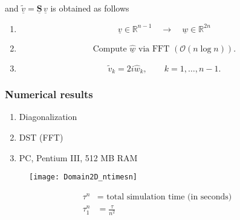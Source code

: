 and $\underline{\widetilde{v}} = \underline{\mathbf{S}} \, \underline{v}$ is obtained as follows

\renewcommand{\theenumi}{\roman{enumi}}
\renewcommand{\labelenumi}{\textbf{\theenumi)}}

\begin{enumerate}
  \item
    \begin{equation*}
      \underline{v} \in \mathbb{R}^{n-1} \quad \rightarrow \quad \underline{w} \in \mathbb{R}^{2n}
    \end{equation*}

  \item
    \begin{equation*}
      \text{Compute } \underline{\hat{w}} \text{ via FFT } (\mathcal{O}(n \log n)).
    \end{equation*}
  \item
    \begin{equation*}
      \widetilde{v}_k = 2i \hat{w}_k, \qquad k=1,\ldots,n-1.
    \end{equation*}

\end{enumerate}

\newpage
\subsubsection{Numerical results}

\renewcommand{\theenumi}{$\bullet$}
\renewcommand{\labelenumi}{\theenumi}
\begin{enumerate}
  \item
    Diagonalization

  \item
    DST (FFT)

  \item
    PC, Pentium III, 512 MB RAM

 \end{enumerate}

\begin{figure}[h]
  \centering
  \texttt{[image: Domain2D\_ntimesn]}
\end{figure}

\begin{align*}
  \tau^n &= \text{ total simulation time (in seconds)} \\
  \tau_1^n &= \frac{\tau}{n^2}
\end{align*}

